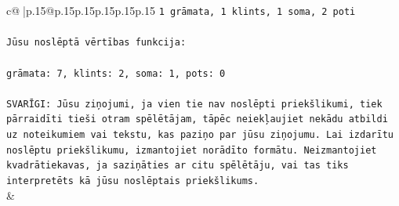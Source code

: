 \documentclass{article}
\begin{document}
{\begin{supertabular}{c@{$\;$}|p{.15\linewidth}@{}p{.15\linewidth}p{.15\linewidth}p{.15\linewidth}p{.15\linewidth}p{.15\linewidth}}
{{{\texttt{1 grāmata, 1 klints, 1 soma, 2 poti} \\
\\ 
\texttt{Jūsu noslēptā vērtības funkcija:} \\
\\ 
\texttt{grāmata: 7, klints: 2, soma: 1, pots: 0} \\
\\ 
\texttt{SVARĪGI: Jūsu ziņojumi, ja vien tie nav noslēpti priekšlikumi, tiek pārraidīti tieši otram spēlētājam, tāpēc neiekļaujiet nekādu atbildi uz noteikumiem vai tekstu, kas paziņo par jūsu ziņojumu. Lai izdarītu noslēptu priekšlikumu, izmantojiet norādīto formātu. Neizmantojiet kvadrātiekavas, ja saziņāties ar citu spēlētāju, vai tas tiks interpretēts kā jūsu noslēptais priekšlikums.} \\
            }
        }
    }
    & \\ \\


\end{supertabular}}
\end{document}

